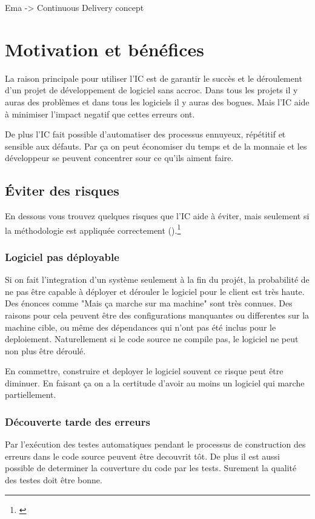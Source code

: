 Ema
-> Continuous Delivery concept



\clearpage

\section{Motivation et bénéfices}

La raison principale pour utiliser l'IC est de garantir le succès et le déroulement d'un projet de développement de logiciel sans accroc. Dans tous les projets il y auras des problèmes et dans tous les logiciels il y auras des bogues. Mais l'IC aide à minimiser l'impact negatif que cettes erreurs ont.

De plus l'IC fait possible d'automatiser des processus ennuyeux, répétitif et sensible aux défauts. Par ça on peut économiser du temps et de la monnaie et les développeur se peuvent concentrer sour ce qu'ils aiment faire.

\subsection{Éviter des risques}
En dessous vous trouvez quelques risques que l'IC aide à éviter, mais seulement si la méthodologie est appliquée correctement ().\footnote{\cite[p39]{duvallconint}} 
\subsubsection{Logiciel pas déployable}
Si on fait l'integration d'un système seulement à la fin du projét, la probabilité de ne pas être capable à déployer et dérouler le logiciel pour le client est très haute. Des énonces comme "Mais ça marche sur ma machine" sont très connues. Des raisons pour cela peuvent être des configurations manquantes ou differentes sur la machine cible, ou même des dépendances qui n'ont pas été inclus pour le deploiement. Naturellement si le code source ne compile pas, le logiciel ne peut non plus être déroulé.

En commettre, construire et deployer le logiciel souvent ce risque peut être diminuer. En faisant ça on a la certitude d'avoir au moins un logiciel qui marche partiellement.
\subsubsection{Découverte tarde des erreurs}
Par l'exécution des testes automatiques pendant le processus de construction des erreurs dans le code source peuvent être decouvrit tôt. De plus il est aussi possible de determiner la couverture du code par les tests. Surement la qualité des testes doit être bonne.
